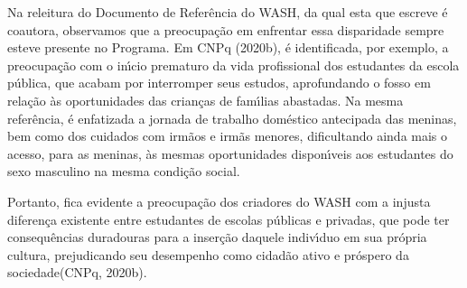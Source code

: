 \documentclass[
12pt,		%
openright,	%
twoside,  %
a4paper,			%
chapter=TITLE,		%
english,			%
french,				%
spanish,			%
brazil				%
]{USPSC-classe/USPSC}
\begin{document}
Na releitura do Documento de Refer\^encia do WASH, da qual esta que escreve \'e coautora, observamos que a preocupa\c{c}\~ao em enfrentar essa disparidade sempre esteve presente no Programa. Em  CNPq (2020b), \'e identificada, por exemplo, a preocupa\c{c}\~ao com o in\'{\i}cio prematuro da vida profissional dos estudantes da escola p\'ublica, que acabam por interromper seus estudos, aprofundando o fosso em rela\c{c}\~ao \`as oportunidades das crian\c{c}as de fam\'{\i}lias abastadas. Na mesma refer\^encia, \'e enfatizada a jornada de trabalho dom\'estico antecipada  das meninas, bem como dos cuidados com irm\~aos e irm\~as menores, dificultando ainda mais o acesso, para as meninas, \`as mesmas oportunidades dispon\'{\i}veis aos estudantes do sexo masculino na mesma condi\c{c}\~ao social.

















Portanto, fica evidente a preocupa\c{c}\~ao dos criadores do WASH com a \textquotedbl  injusta diferen\c{c}a \textquotedbl  existente entre estudantes de escolas p\'ublicas e privadas, que pode ter consequ\^encias duradouras para a inser\c{c}\~ao daquele indiv\'{\i}duo em sua pr\'opria cultura, prejudicando seu desempenho como cidad\~ao ativo e pr\'ospero da sociedade\textquotedbl   (CNPq, 2020b).


















\noindent\begin{center}\mbox{\centering{}}\end{center}
\end{document}

